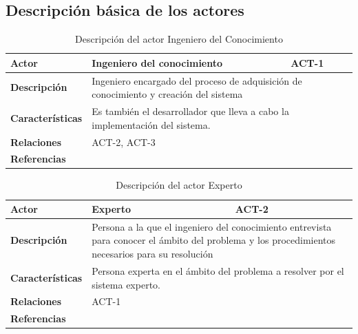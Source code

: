 \subsection{Descripción básica de los actores}

\begin{table}[H]
	\begin{tabular}{@{}|l|p{9cm}|p{2cm}|@{}}
		\hline
		\textbf{Actor}  & Ingeniero del conocimiento & \cellcolor[HTML]{C0C0C0}ACT-1  \\ \hline
		\textbf{Descripción} & \multicolumn{2}{p{11cm}|}{Ingeniero encargado del proceso de adquisición de conocimiento y creación del sistema} \\ \hline
		\textbf{Características} & \multicolumn{2}{p{11cm}|}{Es también el desarrollador que lleva a cabo la implementación del sistema.} \\ \hline
		\textbf{Relaciones} & \multicolumn{2}{p{11cm}|}{ACT-2, ACT-3} \\ \hline
		\textbf{Referencias} & \multicolumn{2}{p{11cm}|}{} \\ \hline
	\end{tabular}
	\caption{Descripción del actor Ingeniero del Conocimiento}
	\label{tablaACT1}
\end{table}

\begin{table}[H]
	\begin{tabular}{@{}|l|p{9cm}|p{2cm}|@{}}
		\hline
		\textbf{Actor} & Experto & \cellcolor[HTML]{C0C0C0}ACT-2 \\ \hline
		\textbf{Descripción} & \multicolumn{2}{p{11cm}|}{Persona a la que el ingeniero del conocimiento entrevista para conocer el ámbito del problema y los procedimientos necesarios para su resolución} \\ \hline
		\textbf{Características} & \multicolumn{2}{p{11cm}|}{Persona experta en el ámbito del problema a resolver por el sistema experto.} \\ \hline
		\textbf{Relaciones} & \multicolumn{2}{p{11cm}|}{ACT-1} \\ \hline
		\textbf{Referencias} & \multicolumn{2}{p{11cm}|}{} \\ \hline
	\end{tabular}
	\caption{Descripción del actor Experto}
	\label{tablaACT2}
\end{table}

